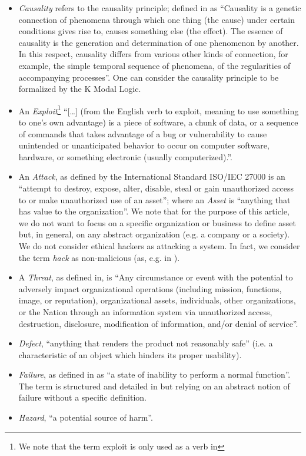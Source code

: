 \documentclass[conference]{IEEEtran}
\begin{document}
\begin{itemize}
	\item \emph{Causality} refers to the causality principle; defined
		in\autocite{Spirkin1983Dialectical} as ``Causality is a genetic
		connection of phenomena through which one thing (the cause)
		under certain conditions gives rise to, causes something else
		(the effect). The essence of causality is the generation and
		determination of one phenomenon by another. In this respect,
		causality differs from various other kinds of connection, for
		example, the simple temporal sequence of phenomena, of the
		regularities of accompanying processes''. One can consider the
		causality principle to be formalized by the K Modal Logic.
	\item An \emph{Exploit}\footnote{We note that the term exploit is only
		used as a verb in\autocite{ISO2009information}} ``[\ldots]
		(from the English verb to exploit, meaning to use something to
		one’s own advantage) is a piece of software, a chunk of data,
		or a sequence of commands that takes advantage of a bug or
		vulnerability to cause unintended or unanticipated behavior to
		occur on computer software, hardware, or something electronic
		(usually computerized).''\autocite{wiki-exploit}.
	\item An \emph{Attack}, as defined by the International Standard
		ISO/IEC 27000 is an ``attempt to destroy, expose, alter,
		disable, steal or gain unauthorized access to or make
		unauthorized use of an asset''; where an \emph{Asset} is
		``anything that has value to the organization''. We note that for
		the purpose of this article, we do not want to focus on a specific
		organization or business to define asset but, in general, on any 
		abstract organization (e.g. a company or a society).
		We do not consider ethical hackers as attacking a system. 
		In fact, we consider the term \emph{hack} as
		non-malicious (as, e.g. in \autocite{Stallman2002hacker}).
	\item A \emph{Threat}, as defined in\autocite{cnssi20104009}, is ``Any
		circumstance or event with the potential to adversely impact
		organizational operations (including mission, functions, image,
		or reputation), organizational assets, individuals, other
		organizations, or the Nation through an information system via
		unauthorized access, destruction, disclosure, modification of
		information, and/or denial of service''.
	\item \emph{Defect}, ``anything that renders the product not reasonably
		safe''\autocite{Robinson2019writing} (i.e. a characteristic of
		an object which hinders its proper usability).
	\item \emph{Failure}, as defined in\autocite{Merriam2020failure} as ``a state of
		inability to perform a normal function''. The term is
		structured and detailed in
		\autocite{cnssi20104009,iet2017glossary} but relying on an
		abstract notion of failure without a specific definition.
	\item \emph{Hazard}, ``a potential source of
		harm''\autocite{iet2017glossary}.
\end{itemize}
\end{document}
